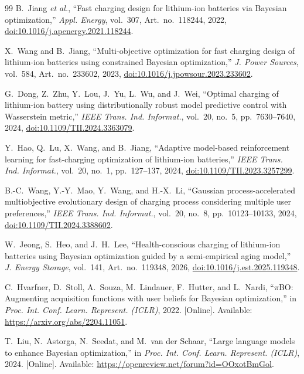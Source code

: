 \documentclass[lettersize,journal]{IEEEtran}
\begin{document}
\begin{thebibliography}{99}
B.~Jiang \textit{et al.},
``Fast charging design for lithium-ion batteries via Bayesian
optimization,''
\textit{Appl. Energy}, vol.~307, Art.~no.~118244, 2022,
\href{https://doi.org/10.1016/j.apenergy.2021.118244}
{doi:10.1016/j.apenergy.2021.118244}.

X.~Wang and B.~Jiang,
``Multi-objective optimization for fast charging design of lithium-ion
batteries using constrained Bayesian optimization,''
\textit{J. Power Sources}, vol.~584, Art.~no.~233602, 2023,
\href{https://doi.org/10.1016/j.jpowsour.2023.233602}
{doi:10.1016/j.jpowsour.2023.233602}.

G.~Dong, Z.~Zhu, Y.~Lou, J.~Yu, L.~Wu, and J.~Wei,
``Optimal charging of lithium-ion battery using distributionally robust
model predictive control with Wasserstein metric,''
\textit{IEEE Trans. Ind. Informat.},
vol.~20, no.~5, pp.~7630--7640, 2024,
\href{https://doi.org/10.1109/TII.2024.3363079}
{doi:10.1109/TII.2024.3363079}.

Y.~Hao, Q.~Lu, X.~Wang, and B.~Jiang,
``Adaptive model-based reinforcement learning for fast-charging
optimization of lithium-ion batteries,''
\textit{IEEE Trans. Ind. Informat.},
vol.~20, no.~1, pp.~127--137, 2024,
\href{https://doi.org/10.1109/TII.2023.3257299}
{doi:10.1109/TII.2023.3257299}.

B.-C.~Wang, Y.-Y.~Mao, Y.~Wang, and H.-X.~Li,
``Gaussian process-accelerated multiobjective evolutionary design
of charging process considering multiple user preferences,''
\textit{IEEE Trans. Ind. Informat.},
vol.~20, no.~8, pp.~10123--10133, 2024,
\href{https://doi.org/10.1109/TII.2024.3388602}
{doi:10.1109/TII.2024.3388602}.

W.~Jeong, S.~Heo, and J.~H.~Lee,
``Health-conscious charging of lithium-ion batteries using
Bayesian optimization guided by a semi-empirical aging model,''
\textit{J. Energy Storage},
vol.~141, Art.~no.~119348, 2026,
\href{https://doi.org/10.1016/j.est.2025.119348}
{doi:10.1016/j.est.2025.119348}.

C.~Hvarfner, D.~Stoll, A.~Souza, M.~Lindauer,
F.~Hutter, and L.~Nardi,
``$\pi$BO: Augmenting acquisition functions with user beliefs
for Bayesian optimization,''
in \textit{Proc. Int. Conf. Learn. Represent. (ICLR)}, 2022.
[Online]. Available:
\url{https://arxiv.org/abs/2204.11051}.

T.~Liu, N.~Astorga, N.~Seedat, and M.~van der Schaar,
``Large language models to enhance Bayesian optimization,''
in \textit{Proc. Int. Conf. Learn. Represent. (ICLR)}, 2024.
[Online]. Available:
\url{https://openreview.net/forum?id=OOxotBmGol}.


\end{thebibliography}
\end{document}
